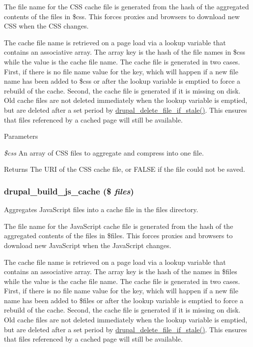 The file name for the CSS cache file is generated from the hash of the aggregated contents of the files in \$css. This forces proxies and browsers to download new CSS when the CSS changes.

The cache file name is retrieved on a page load via a lookup variable that contains an associative array. The array key is the hash of the file names in \$css while the value is the cache file name. The cache file is generated in two cases. First, if there is no file name value for the key, which will happen if a new file name has been added to \$css or after the lookup variable is emptied to force a rebuild of the cache. Second, the cache file is generated if it is missing on disk. Old cache files are not deleted immediately when the lookup variable is emptied, but are deleted after a set period by \hyperlink{common_8inc_af70ef23972aa97b49877d5269c8f321c}{drupal\_\-delete\_\-file\_\-if\_\-stale()}. This ensures that files referenced by a cached page will still be available.


\begin{DoxyParams}{Parameters}
\item[{\em \$css}]An array of CSS files to aggregate and compress into one file.\end{DoxyParams}
\begin{DoxyReturn}{Returns}
The URI of the CSS cache file, or FALSE if the file could not be saved. 
\end{DoxyReturn}
\hypertarget{common_8inc_a1e1e39db4d513a984d7d76ba8cd68a9b}{
\subsubsection[{drupal\_\-build\_\-js\_\-cache}]{\setlength{\rightskip}{0pt plus 5cm}drupal\_\-build\_\-js\_\-cache (\$ {\em files})}}
\label{common_8inc_a1e1e39db4d513a984d7d76ba8cd68a9b}
Aggregates JavaScript files into a cache file in the files directory.

The file name for the JavaScript cache file is generated from the hash of the aggregated contents of the files in \$files. This forces proxies and browsers to download new JavaScript when the JavaScript changes.

The cache file name is retrieved on a page load via a lookup variable that contains an associative array. The array key is the hash of the names in \$files while the value is the cache file name. The cache file is generated in two cases. First, if there is no file name value for the key, which will happen if a new file name has been added to \$files or after the lookup variable is emptied to force a rebuild of the cache. Second, the cache file is generated if it is missing on disk. Old cache files are not deleted immediately when the lookup variable is emptied, but are deleted after a set period by \hyperlink{common_8inc_af70ef23972aa97b49877d5269c8f321c}{drupal\_\-delete\_\-file\_\-if\_\-stale()}. This ensures that files referenced by a cached page will still be available.


